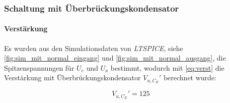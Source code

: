 \documentclass[12pt,english,ngerman]{scrartcl}
\begin{document}

\subsubsection{Schaltung mit Überbrückungskondensator}


\paragraph{Verstärkung}

Es wurden aus den Simulationsdaten von \textit{LTSPICE}, siehe
\autoref{fig:sim_mit_normal_eingang} und \autoref{fig:sim_mit_normal_ausgang},
die Spitzenspannungen für $U_e$ und $U_a$ bestimmt, wodurch mit
\autoref{eq:verst} die Verstärkung mit Überbrückungskondensator $V_{u,C_{E}}'$
berechnet wurde:

\begin{equation}
  V_{u,C_{E}}' = 125
  \label{eq:sim_verst_mit}
\end{equation}





\end{document}
